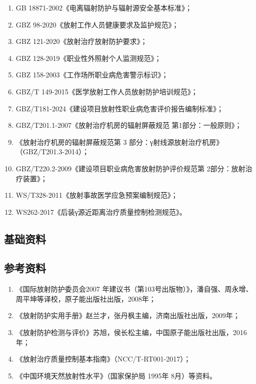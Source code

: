 \begin{enumerate}
\item GB 18871-2002《电离辐射防护与辐射源安全基本标准》；
\item GBZ 98-2020《放射工作人员健康要求及监护规范》；
\item GBZ 121-2020《放射治疗放射防护要求》；
\item GBZ 128-2019《职业性外照射个人监测规范》；
\item GBZ 158-2003《工作场所职业病危害警示标识》；
\item GBZ/T 149-2015《医学放射工作人员放射防护培训规范》；
\item GBZ/T181-2024《建设项目放射性职业病危害评价报告编制标准》；
\item GBZ/T201.1-2007《放射治疗机房的辐射屏蔽规范 第1部分：一般原则》；
\item 《放射治疗机房的辐射屏蔽规范第 3 部分：γ射线源放射治疗机房》\\（GBZ/T201.3-2014）；
\item GBZ/T220.2-2009《建设项目职业病危害放射防护评价规范第 2部分：放射治疗装置》；
\item WS/T328-2011《放射事故医学应急预案编制规范》；
\item WS262-2017《后装γ源近距离治疗质量控制检测规范》。
\end{enumerate}

\subsection{基础资料}



\subsection{参考资料}
\begin{enumerate}
\item 《国际放射防护委员会2007 年建议书（第103号出版物）》，潘自强、周永增、周平坤等译校，原子能出版社出版，2008年；
\item 《放射防护实用手册》赵兰才，张丹枫主编，济南出版社出版，2009年；
\item 《放射防护检测与评价》苏旭，侯长松主编，中国原子能出版社出版，2016年；
\item 《放射治疗质量控制基本指南》（NCC/T-RT001-2017）；
\item 《中国环境天然放射性水平》（国家保护局 1995年 8月）等资料。
\end{enumerate}

